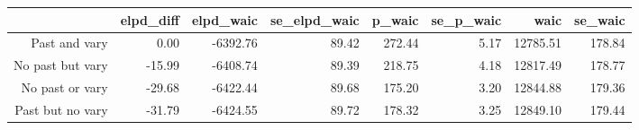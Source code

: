 \begin{table}[ht]
\centering
\begin{tabular}{rrrrrrrr}
  \hline
 & elpd\_diff & elpd\_waic & se\_elpd\_waic & p\_waic & se\_p\_waic & waic & se\_waic \\ 
  \hline
Past and vary & 0.00 & -6392.76 & 89.42 & 272.44 & 5.17 & 12785.51 & 178.84 \\ 
  No past but vary & -15.99 & -6408.74 & 89.39 & 218.75 & 4.18 & 12817.49 & 178.77 \\ 
  No past or vary & -29.68 & -6422.44 & 89.68 & 175.20 & 3.20 & 12844.88 & 179.36 \\ 
  Past but no vary & -31.79 & -6424.55 & 89.72 & 178.32 & 3.25 & 12849.10 & 179.44 \\ 
   \hline
\end{tabular}
\end{table}
